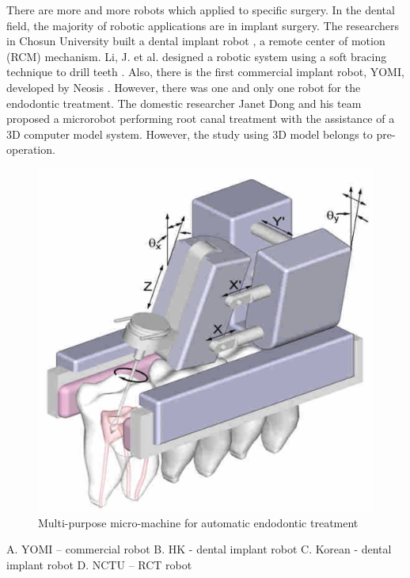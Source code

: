 There are more and more robots which applied to specific surgery. In the dental field, the majority of robotic applications are in implant surgery. The researchers in Chosun University built a dental implant robot \cite{Kim2009ASO}, a remote center of motion (RCM) mechanism. Li, J. et al. designed a robotic system using a soft bracing technique to drill teeth \cite{Li2019ACD}. Also, there is the first commercial implant robot, YOMI, developed by Neosis \cite{web3}. However, there was one and only one robot for the endodontic treatment. The domestic researcher Janet Dong and his team proposed a microrobot performing root canal treatment with the assistance of a 3D computer model system. However, the study using 3D model belongs to pre-operation.
\begin{figure}[htbp]
\begin{center}
\includegraphics[width=0.7\linewidth]{Images/NCTU_1.png}
\caption{
Multi-purpose micro-machine for automatic endodontic treatment
}\label{fig:NCTU_1}
\end{center}
\end{figure}
A.	YOMI – commercial robot
B.	HK - dental implant robot
C.	Korean - dental implant robot
D.	NCTU – RCT robot


						
